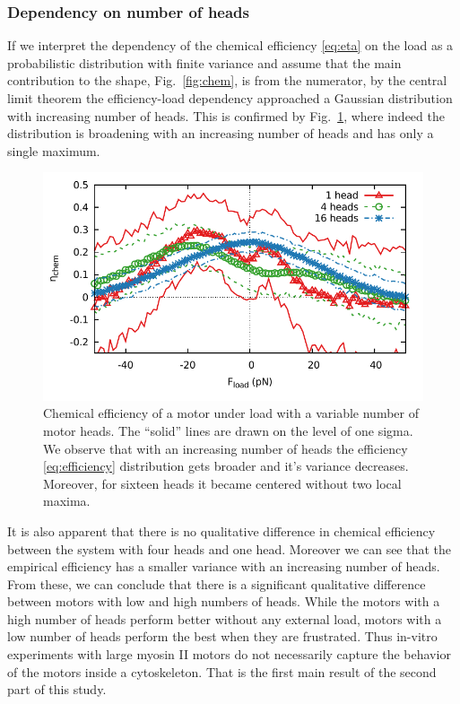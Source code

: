 \documentclass[aps,pre,twocolumn,showpacs,showkeys,superscriptaddress,floatfix]{revtex4-1}
\begin{document}
\subsubsection{Dependency on number of heads}
If we interpret the dependency of the chemical efficiency \eqref{eq:eta} on the load as a probabilistic distribution with finite variance and assume that the main contribution to the shape, Fig.~\ref{fig:chem}, is from the numerator, 
by the central limit theorem the efficiency-load dependency approached a Gaussian distribution with increasing number of heads. 
This is confirmed by Fig.~\ref{fig:chem_eff_1head}, where indeed the distribution is broadening with an increasing number of heads and has only a single maximum.
\begin{figure}[t]
\centering
\includegraphics[width=0.9\linewidth,height=!]{chemical_cycle_1head}
\caption{
\label{fig:chem_eff_1head}
Chemical efficiency of a motor under load with a variable number of motor heads.
The ``solid'' lines are drawn on the level of one sigma. 
We observe that with an increasing number of heads the efficiency \eqref{eq:efficiency} distribution gets broader and it's variance decreases.
Moreover, for sixteen heads it became centered without two local maxima.
}
\end{figure}
It is also apparent that there is no qualitative difference in chemical efficiency between the system with four heads and one head.
Moreover we can see that the empirical efficiency has a smaller variance with an increasing number of heads. 
From these, we can conclude that there is a significant qualitative difference between motors with low and high numbers of heads.
While the motors with a high number of heads perform better without any external load, motors with a low number of heads perform the best when they are frustrated.
Thus in-vitro experiments with large myosin II motors \cite{brown2009cross-correlated} do not necessarily capture the behavior of the motors inside a cytoskeleton.
That is the first main result of the second part of this study.  
\end{document}
